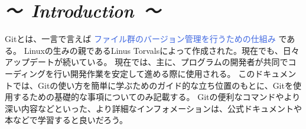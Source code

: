 \documentclass[11pt,a4paper,openany,dvipdfmx]{jsarticle}
\begin{document}
\section*{\it {～\ Introduction\ ～}}





Gitとは、一言で言えば\textcolor{RoyalBlue}{ ファイル群のバージョン管理を行うための仕組み }である。
Linuxの生みの親であるLinus Torvalsによって作成された。現在でも、日々アップデートが続いている。
現在では、主に、プログラムの開発者が共同でコーディングを行い開発作業を安定して進める際に使用される。
このドキュメントでは、Gitの使い方を簡単に学ぶためのガイド的な立ち位置のもとに、Gitを使用するための基礎的な事項についてのみ記載する。
Gitの便利なコマンドやより深い内容などといった、より詳細なインフォメーションは、公式ドキュメントや本などで学習すると良いだろう。


\end{document}
